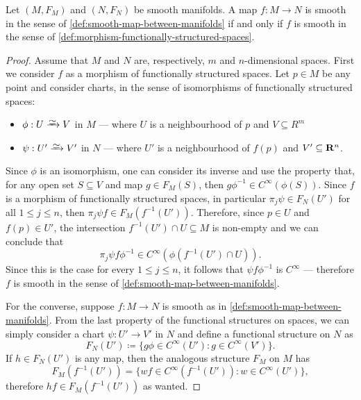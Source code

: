 \begin{lemma}
    \label{lem:equiv-smooth-map-definition}
    Let \((M, F_M)\) and \((N, F_N)\) be smooth manifolds. A map \(f: M \to N\) is
    smooth in the sense of \cref{def:smooth-map-between-manifolds} if and only if
    \(f\) is smooth in the sense of
    \cref{def:morphism-functionally-structured-spaces}.
\end{lemma}

\begin{proof}
    Assume that \(M\) and \(N\) are, respectively, \(m\) and \(n\)-dimensional
    spaces. First we consider \(f\) as a morphism of functionally structured spaces.
    Let \(p \in M\) be any point and consider charts, in the sense of isomorphisms
    of functionally structured spaces:
    \begin{itemize}\setlength\itemsep{0em}
        \item \(\phi: U \isoto V\) in \(M\) --- where \(U\) is a neighbourhood of \(p\)
              and \(V \subseteq R^m\)

        \item \(\psi: U' \isoto V'\) in \(N\) --- where \(U'\) is a neighbourhood of
              \(f(p)\) and \(V' \subseteq \mathbf{R}^n\).
    \end{itemize}
    Since \(\phi\) is an isomorphism, one can consider its inverse and use the
    property that, for any open set \(S \subseteq V\) and map \(g \in F_M(S)\), then
    \(g \phi^{-1} \in C^{\infty}(\phi(S))\). Since \(f\) is a morphism of functionally
    structured spaces, in particular \(\pi_j \psi \in F_N(U')\) for all \(1 \leq j
    \leq n\), then \(\pi_j \psi f \in F_M(f^{-1}(U'))\). Therefore, since \(p \in
    U\) and \(f(p) \in U'\), the intersection \(f^{-1}(U') \cap U \subseteq M\) is
    non-empty and we can conclude that
    \[
        \pi_j \psi f \phi^{-1} \in C^{\infty}(\phi(f^{-1}(U') \cap U)).
    \]
    Since this is the case for every \(1 \leq j \leq n\), it follows that
    \(\psi f \phi^{-1}\) is \(C^{\infty}\) --- therefore \(f\) is smooth in the
    sense of \cref{def:smooth-map-between-manifolds}.

    For the converse, suppose \(f: M \to N\) is smooth as in
    \cref{def:smooth-map-between-manifolds}. From the last property of the
    functional structures on spaces, we can simply consider a chart \(\psi: U' \to
    V'\) in \(N\) and define a functional structure on \(N\) as
    \[
        F_N(U') \coloneq \{g \phi \in C^{\infty}(U') \colon g \in C^{\infty}(V')\}.
    \]
    If \(h \in F_N(U')\) is any map, then the analogous structure \(F_M\) on \(M\)
    has
    \[
        F_M(f^{-1}(U')) = \{w f \in C^{\infty}(f^{-1}(U')) \colon w \in C^{\infty}(U')\},
    \]
    therefore \(h f \in F_M(f^{-1}(U'))\) as wanted.
\end{proof}

